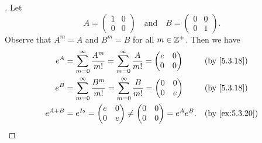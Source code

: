 \begin{proof}[]
  Let
  \[
    A = \begin{pmatrix}
      1 & 0 \\
      0 & 0
    \end{pmatrix} \quad \text{and} \quad B = \begin{pmatrix}
      0 & 0 \\
      0 & 1
    \end{pmatrix}.
  \]
  Observe that \(A^m = A\) and \(B^m = B\) for all \(m \in \mathbb{Z}^+\).
  Then we have
  \begin{align*}
    e^A       & = \sum_{m = 0}^\infty \frac{A^m}{m!} = \sum_{m = 0}^\infty \frac{A}{m!} = \begin{pmatrix}
                                                                                            e & 0 \\
                                                                                            0 & 0
                                                                                          \end{pmatrix} &  & \by{5.3.18}                           \\
    e^B       & = \sum_{m = 0}^\infty \frac{B^m}{m!} = \sum_{m = 0}^\infty \frac{B}{m!} = \begin{pmatrix}
                                                                                            0 & 0 \\
                                                                                            0 & e
                                                                                          \end{pmatrix} &  & \by{5.3.18}                           \\
    e^{A + B} & = e^{I_2} = \begin{pmatrix}
                              e & 0 \\
                              0 & e
                            \end{pmatrix} \neq \begin{pmatrix}
                                                 0 & 0 \\
                                                 0 & 0
                                               \end{pmatrix} = e^A e^B.                                                        &  & \by{ex:5.3.20}
  \end{align*}
\end{proof}

